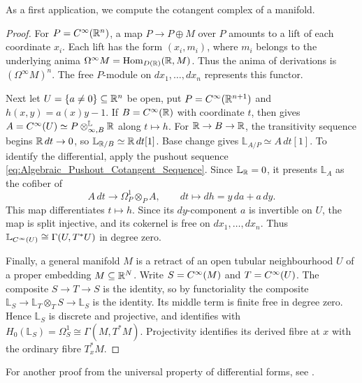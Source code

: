 As a first application, we compute the cotangent complex of a manifold.


\begin{proof}
For $P=C^\infty(\mathbb{R}^n)$, a map $P\to P\oplus M$ over $P$ amounts to a
lift of each coordinate $x_i$. Each lift has the form $(x_i,m_i)$,
where $m_i$ belongs to the underlying anima
$\Omega^\infty M=\operatorname{Hom}_{D(\mathbb{R})}(\mathbb{R},M)$. Thus the anima of derivations
is $(\Omega^\infty M)^n$. The free $P$-module on $dx_1,\ldots,dx_n$
represents this functor.

Next let $U=\{a\neq0\}\subseteq\mathbb{R}^n$ be open, put
$P=C^\infty(\mathbb{R}^{n+1})$ and $h(x,y)=a(x)y-1$. If $B=C^\infty(\mathbb{R})$ with
coordinate $t$, then  gives
$A=C^\infty(U)\simeq P\otimes^{\mathbb L}_{\infty,B}\mathbb{R}$ along $t\mapsto h$.
For $\mathbb{R}\to B\to\mathbb{R}$, the transitivity sequence begins $\mathbb{R}\,dt\to 0$,
so $\mathbb L_{\mathbb{R}/B}\simeq\mathbb{R}\,dt[1]$. Base change gives
$\mathbb L_{A/P}\simeq A\,dt[1]$. To identify the differential, apply
the pushout sequence \eqref{eq:Algebraic_Pushout_Cotangent_Sequence}.
Since $\mathbb L_{\mathbb{R}}=0$, it presents $\mathbb L_A$ as the cofiber of
\[
 A\,dt\longrightarrow\Omega_P^1\otimes_P A,\qquad
 dt\longmapsto d h=y\,da+a\,dy.
\]
This map differentiates $t\mapsto h$. Since its $dy$-component $a$
is invertible on $U$, the map is split injective,
and its cokernel is free on $dx_1,\ldots,dx_n$. Thus
$\mathbb L_{C^\infty(U)}\cong\Gamma(U,T^*U)$ in degree zero.

Finally, a general manifold $M$ is a retract of an open tubular
neighbourhood $U$ of a proper embedding $M\subseteq\mathbb{R}^N$. Write
$S=C^\infty(M)$ and $T=C^\infty(U)$. The composite $S\to T\to S$ is the
identity, so by functoriality the composite
$\mathbb L_S\to\mathbb L_T\otimes_T S\to\mathbb L_S$ is the identity.
Its middle term is finite free in degree zero. Hence $\mathbb L_S$
is discrete and projective, and identifies with
$H_0(\mathbb L_S)=\Omega^1_S\cong\Gamma(M,T^*M)$.
Projectivity identifies its derived fibre at $x$ with the ordinary
fibre $T_x^*M$.
\end{proof}

For another proof from the universal property of differential forms, see
\citet[Theorem~3.3.11]{Pascarella_Cotangent_Complex_Derived_Differential_Geometry}.

